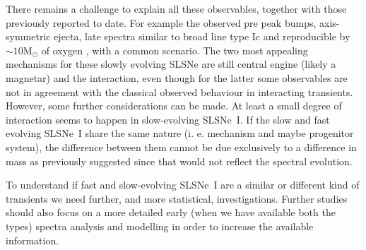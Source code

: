 \documentclass[useAMS,usenatbib]{mn2e}
\def\M{M$_{\odot}$}
\begin{document}
There remains a challenge to explain all these  observables, together with those previously reported to date. 
For example the observed  pre peak bumps, axis-symmetric ejecta, late spectra similar to broad line type Ic and reproducible by $\sim10$\M\/ of oxygen \citep{ni15a,sm16,ni16a1,in16c,je16,ni16b}, with a common scenario. The two most appealing mechanisms 
for these slowly evolving SLSNe are still central engine (likely a magnetar) and the interaction, even though for the latter some observables are not in agreement with the classical observed behaviour in interacting transients. However, some further considerations can be made. At least a small degree of interaction seems to happen in slow-evolving SLSNe~I. If the slow and fast evolving SLSNe~I share the same nature (i. e. mechanism and maybe progenitor system), the difference between them cannot be due exclusively to a difference in mass as previously suggested \citep{ni15} since that would not reflect the spectral evolution.

To understand if fast and slow-evolving SLSNe~I are a similar or different kind of transients we need further, and more statistical, investigations. Further studies should also focus on a more detailed early (when we have available both the types) spectra analysis and modelling in order to increase the available information. 
\end{document}
